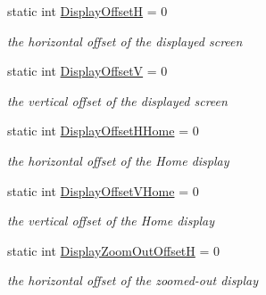 \begin{DoxyCompactItemize}
\item 
\mbox{\label{class_t_display_a9a9f37c50df125f2543f251460caf841}} 
static int \mbox{\hyperlink{class_t_display_a9a9f37c50df125f2543f251460caf841}{Display\+OffsetH}} = 0
\begin{DoxyCompactList}\small\item\em the horizontal offset of the displayed screen \end{DoxyCompactList}\item 
\mbox{\label{class_t_display_a6f11e4ccff893eef6ab624a7430974c3}} 
static int \mbox{\hyperlink{class_t_display_a6f11e4ccff893eef6ab624a7430974c3}{Display\+OffsetV}} = 0
\begin{DoxyCompactList}\small\item\em the vertical offset of the displayed screen \end{DoxyCompactList}\item 
\mbox{\label{class_t_display_aef050e7f3b440542a12bbccd27bcd99d}} 
static int \mbox{\hyperlink{class_t_display_aef050e7f3b440542a12bbccd27bcd99d}{Display\+Offset\+H\+Home}} = 0
\begin{DoxyCompactList}\small\item\em the horizontal offset of the \textquotesingle{}Home\textquotesingle{} display \end{DoxyCompactList}\item 
\mbox{\label{class_t_display_a4ea243ff377fcc09d3da53dbb2b18dfe}} 
static int \mbox{\hyperlink{class_t_display_a4ea243ff377fcc09d3da53dbb2b18dfe}{Display\+Offset\+V\+Home}} = 0
\begin{DoxyCompactList}\small\item\em the vertical offset of the \textquotesingle{}Home\textquotesingle{} display \end{DoxyCompactList}\item 
\mbox{\label{class_t_display_aa26d2bf6d6d14ad1c853f81f06f25121}} 
static int \mbox{\hyperlink{class_t_display_aa26d2bf6d6d14ad1c853f81f06f25121}{Display\+Zoom\+Out\+OffsetH}} = 0
\begin{DoxyCompactList}\small\item\em the horizontal offset of the zoomed-\/out display \end{DoxyCompactList}\item 

\end{DoxyCompactItemize}
